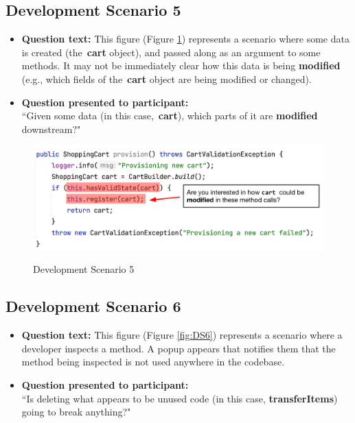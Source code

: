 \subsection{Development Scenario 5}

\begin{itemize}
  \item[] \textbf{Question text:} This figure (Figure \ref{fig:DS5}) represents 
          a scenario where some data is created (the \textbf{cart} object), and
          passed along as an argument to some methods. It may not be 
          immediately clear how this data is being \textbf{modified} (e.g., 
          which fields of the \textbf{cart} object are being modified or changed).
  \item[] \textbf{Question presented to participant:}  \\
          ``Given some data (in this case, \textbf{cart}), which parts of it
          are \textbf{modified} downstream?"
\end{itemize}

\begin{figure}[ht]
\centering
\caption{Development Scenario 5}
\includegraphics[width=\textwidth]{./figs/ds5.png}
\label{fig:DS5}
\end{figure}

\subsection{Development Scenario 6}

\begin{itemize}
  \item[] \textbf{Question text:} This figure (Figure \ref{fig:DS6}) represents 
          a scenario where a developer inspects a method. A popup appears that 
          notifies them that the method being inspected is not used anywhere in 
          the codebase.
  \item[] \textbf{Question presented to participant:}  \\
         ``Is deleting what appears to be unused code (in this case, 
         \textbf{transferItems}) going to break anything?"
\end{itemize}

